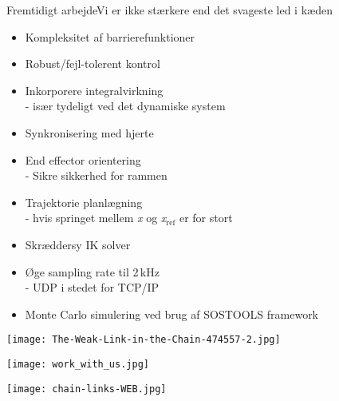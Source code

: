 \begin{frame}{Fremtidigt arbejde}{Vi er ikke stærkere end det svageste led i kæden}
\begin{minipage}{0.65\textwidth}
\begin{block}{}
	\begin{itemize}
		\item \normalsize Kompleksitet af barrierefunktioner
		\item \normalsize Robust/fejl-tolerent kontrol %
		\item \normalsize Inkorporere integralvirkning \\ 
		\scriptsize {\color{white}{m}} - især tydeligt ved det dynamiske system
		\item \normalsize Synkronisering med hjerte
		\item \normalsize End effector orientering \\
		\scriptsize {\color{white}{m}} -  Sikre sikkerhed for rammen
		\item \normalsize  Trajektorie planlægning \\ 
		\scriptsize {\color{white}{m}} - hvis springet mellem \textit{x} og \textit{x}$_{\text{ref}}$ er for stort
		\item \normalsize Skræddersy IK solver
		\item Øge sampling rate til 2\,kHz \\
		\scriptsize {\color{white}{m}} - UDP i stedet for TCP/IP
		\item \normalsize  Monte Carlo simulering ved brug af SOSTOOLS framework
	\end{itemize}
\end{block}
\end{minipage}
\begin{minipage}{0.3\textwidth}
\texttt{[image: The-Weak-Link-in-the-Chain-474557-2.jpg]}
\vspace*{0.2cm}

\texttt{[image: work\_with\_us.jpg]}
\vspace*{0.2cm}

\texttt{[image: chain-links-WEB.jpg]}
\end{minipage}
\end{frame}